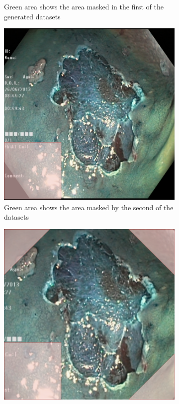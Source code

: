 \begin{figure}[h!]
\begin{subfigure}[t]{0.4\textwidth}
         \caption{Green area shows the area masked in the first of the generated datasets}
         \label{fig:CornerMask}
     \end{subfigure}
     \hfill
     \begin{subfigure}[t]{0.4\textwidth}
         \centering
         \includegraphics[width=\textwidth]{methodology/figures/greenmask.png}
         \caption{Green area shows the area masked by the second of the datasets}
         \label{fig:GreenMask}
     \end{subfigure}     
     \hfill
     \begin{subfigure}[t]{0.4\textwidth}
         \centering
         \includegraphics[width=\textwidth]{methodology/figures/bothmask.png}

\end{subfigure}
\end{figure}
